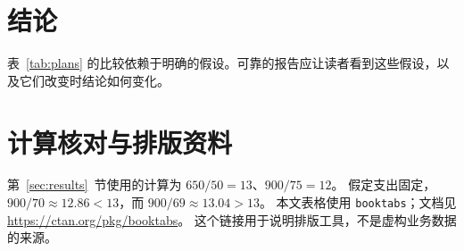 \documentclass[UTF8,a4paper,fontset=fandol]{ctexart}
\begin{document}
\section{结论}
表~\ref{tab:plans} 的比较依赖于明确的假设。可靠的报告应让读者看到这些假设，以及它们改变时结论如何变化。
\appendix
\section{计算核对与排版资料}
第~\ref{sec:results}~节使用的计算为 $650/50=13$、$900/75=12$。
假定支出固定，$900/70\approx12.86<13$，而 $900/69\approx13.04>13$。
本文表格使用 \texttt{booktabs}；文档见\url{https://ctan.org/pkg/booktabs}。
这个链接用于说明排版工具，不是虚构业务数据的来源。
\end{document}

